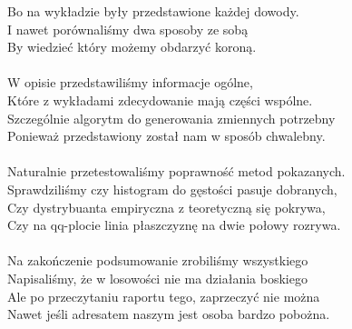 \documentclass[12pt]{mwrep}
\begin{document}
	Bo na wykładzie były przedstawione każdej dowody.\\
	I nawet porównaliśmy dwa sposoby ze sobą\\
	By wiedzieć który możemy obdarzyć koroną.\\
	\\
	W opisie przedstawiliśmy informacje ogólne,\\
	Które z wykładami zdecydowanie mają części wspólne.\\
	Szczególnie algorytm do generowania zmiennych potrzebny\\
	Ponieważ przedstawiony został nam w sposób chwalebny.\\
	\\
	Naturalnie przetestowaliśmy poprawność metod pokazanych.\\
	Sprawdziliśmy czy histogram do gęstości pasuje dobranych,\\
	Czy dystrybuanta empiryczna z teoretyczną się pokrywa,\\
	Czy na qq-plocie linia płaszczyznę na dwie połowy rozrywa.\\
	\\
	Na zakończenie podsumowanie zrobiliśmy wszystkiego\\
	Napisaliśmy, że w losowości nie ma działania boskiego\\
	Ale po przeczytaniu raportu tego, zaprzeczyć nie można\\
	Nawet jeśli adresatem naszym jest osoba bardzo pobożna.\\
\end{document}
